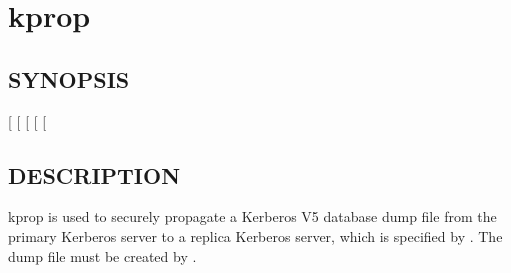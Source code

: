 \documentclass[letterpaper,10pt,english]{sphinxmanual}
\begin{document}
\section{kprop}
\label{\detokenize{admin/admin_commands/kprop:kprop}}\label{\detokenize{admin/admin_commands/kprop:kprop-8}}\label{\detokenize{admin/admin_commands/kprop::doc}}

\subsection{SYNOPSIS}
\label{\detokenize{admin/admin_commands/kprop:synopsis}}
\sphinxAtStartPar
{}
{[} \sphinxstyleemphasis{realm}{]}
{[} \sphinxstyleemphasis{file}{]}
{[}\sphinxstylestrong{\sphinxhyphen{}d}{]}
{[} \sphinxstyleemphasis{port}{]}
{[} \sphinxstyleemphasis{keytab}{]}


\subsection{DESCRIPTION}
\label{\detokenize{admin/admin_commands/kprop:description}}
\sphinxAtStartPar
kprop is used to securely propagate a Kerberos V5 database dump file
from the primary Kerberos server to a replica Kerberos server, which is
specified by .  The dump file must be created by
{\hyperref[\detokenize{admin/admin_commands/kdb5_util:kdb5-util-8}]{}}.
\end{document}

